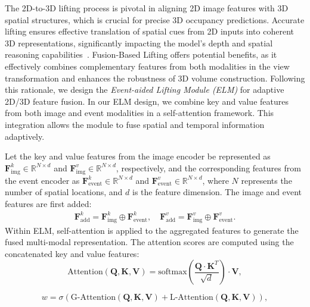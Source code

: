 % 
The 2D-to-3D lifting process is pivotal in aligning 2D image features with 3D spatial structures, which is crucial for precise 3D occupancy predictions. 
%
Accurate lifting ensures effective translation of spatial cues from 2D inputs into coherent 3D representations, significantly impacting the model’s depth and spatial reasoning capabilities~\cite{philion2020lift,li2023bevdepth}. 
Fusion-Based Lifting offers potential benefits,
%
as it effectively combines complementary features from both modalities in the view transformation and enhances the robustness of 3D volume construction. 
%
Following this rationale, we design the \emph{Event-aided Lifting Module (ELM)} for adaptive 2D/3D feature fusion. 
In our ELM design, we combine key and value features from both image and event modalities in a self-attention framework. 
This integration allows the module to fuse spatial and temporal information adaptively.
%

Let the key and value features from the image encoder be represented as \( \mathbf{F}^{k}_{\text{img}} {\in} \mathbb{R}^{N \times d} \) and \( \mathbf{F}^{v}_{\text{img}} {\in} \mathbb{R}^{N \times d} \), respectively, and the corresponding features from the event encoder as \( \mathbf{F}^{k}_{\text{event}} {\in} \mathbb{R}^{N \times d} \) and \( \mathbf{F}^{v}_{\text{event}} {\in} \mathbb{R}^{N \times d} \), where \( N \) represents the number of spatial locations, and \( d \) is the feature dimension.
The image and event features are first added:
\begin{align}
   \mathbf{F}^{k}_{\text{add}} = \mathbf{F}^{k}_{\text{img}} \oplus \mathbf{F}^{k}_{\text{event}}, \quad \mathbf{F}^{v}_{\text{add}} = \mathbf{F}^{v}_{\text{img}} \oplus \mathbf{F}^{v}_{\text{event}}.
\end{align}
Within ELM, self-attention is applied to the aggregated features to generate the fused multi-modal representation. The attention scores are computed using the concatenated key and value features:
\vspace{-1em} 
\begin{equation}
   \text{Attention}(\mathbf{Q}, \mathbf{K}, \mathbf{V}) = \text{softmax} \left( \frac{\mathbf{Q} \cdot \mathbf{K}^T}{\sqrt{d}} \right) \cdot \mathbf{V},
\end{equation}

\begin{equation}
   w = \sigma\left( \text{G-Attention}(\mathbf{Q}, \mathbf{K}, \mathbf{V}) + \text{L-Attention}(\mathbf{Q}, \mathbf{K}, \mathbf{V}) \right),
\end{equation}

